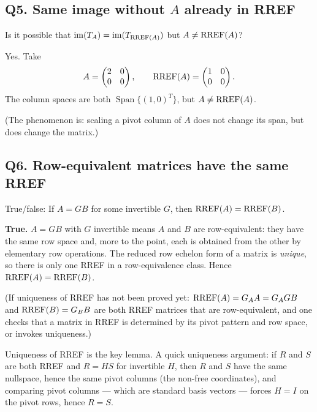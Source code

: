 \subsection{Q5. Same image without $A$ already in RREF}

\begin{promptbox}
Is it possible that $\operatorname{im}(T_A)=\operatorname{im}(T_{\operatorname{RREF}(A)})$ but $A\neq\operatorname{RREF}(A)$?
\end{promptbox}

\begin{coursebox}
Yes. Take
\[
A=\begin{pmatrix}2&0\\0&0\end{pmatrix},\qquad
\operatorname{RREF}(A)=\begin{pmatrix}1&0\\0&0\end{pmatrix}.
\]
The column spaces are both $\operatorname{Span}\{(1,0)^T\}$, but $A\neq\operatorname{RREF}(A)$.

(The phenomenon is: scaling a pivot column of $A$ does not change its span, but
does change the matrix.)
\end{coursebox}

\subsection{Q6. Row-equivalent matrices have the same RREF}

\begin{promptbox}
True/false: If $A=GB$ for some invertible $G$, then $\operatorname{RREF}(A)=\operatorname{RREF}(B)$.
\end{promptbox}

\begin{coursebox}
\textbf{True.}
$A=GB$ with $G$ invertible means $A$ and $B$ are row-equivalent: they have the
same row space and, more to the point, each is obtained from the other by
elementary row operations. The reduced row echelon form of a matrix is
\emph{unique}, so there is only one RREF in a row-equivalence class. Hence
$\operatorname{RREF}(A)=\operatorname{RREF}(B)$.

(If uniqueness of RREF has not been proved yet: $\operatorname{RREF}(A)=G_A A=G_A G B$ and
$\operatorname{RREF}(B)=G_B B$ are both RREF matrices that are row-equivalent, and one checks
that a matrix in RREF is determined by its pivot pattern and row space, or
invokes uniqueness.)
\end{coursebox}

\begin{laterbox}
Uniqueness of RREF is the key lemma. A quick uniqueness argument: if $R$ and $S$
are both RREF and $R=HS$ for invertible $H$, then $R$ and $S$ have the same
nullspace, hence the same pivot columns (the non-free coordinates), and comparing
pivot columns --- which are standard basis vectors --- forces $H=I$ on the
pivot rows, hence $R=S$.
\end{laterbox}

